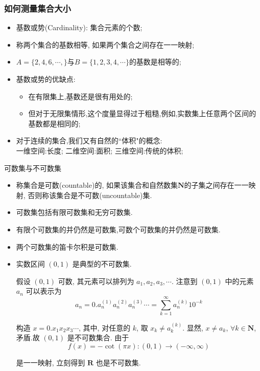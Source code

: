 \documentclass[Prob-All.tex]{subfiles}
\begin{document}
\begin{frame}
	\frametitle{如何测量集合大小}
	\begin{itemize}[<+-|alert@+>]
		\item  基数或势({\rm Cardinality}): 集合元素的个数;
		\item 称两个集合的基数相等, 如果两个集合之间存在一一映射;
		\item $A=\{2,4,6,\cdots,\}$与$B=\{1,2,3,4,\cdots\}$的基数是相等的;
		\item  基数或势的优缺点:
		\begin{itemize}[<+-|alert@+>]
			\item 在有限集上,基数还是很有用处的;
			\item 但对于无限集情形,这个度量显得过于粗糙,例如,实数集上任意两个区间的基数都是相同的;
		\end{itemize}
		\item 对于连续的集合,我们又有自然的``体积"的概念: \\
		一维空间:长度; 二维空间:面积; 三维空间:传统的体积;


	\end{itemize}
\end{frame}
\begin{frame}{可数集与不可数集}
\begin{itemize}[<+-|alert@+>]
	\item 称集合是可数(countable)的, 如果该集合和自然数集${\mathbf{N}}$的子集之间存在一一映射, 否则称该集合是不可数(uncountable)集.
	\item 可数集包括有限可数集和无穷可数集.
	\item 有限个可数集的并仍然是可数集,可数个可数集的并仍然是可数集.
	\item 两个可数集的笛卡尔积是可数集.
	\item 实数区间 ${(0,1)}$ 是典型的不可数集.\pause

	假设 ${(0,1)}$ 可数, 其元素可以排列为 ${a_{1}, a_{2}, a_{3}, \cdots}$. 注意到 ${(0,1)}$ 中的元素 ${a_{n}}$ 可以表示为
	\[
	a_{n}=0. a_{n}^{(1)} a_{n}^{(2)} a_{n}^{(3)} \cdots=\sum_{k=1}^{\infty} a_{n}^{(k)} 10^{-k}
	\]
	\pause

	构造 ${x=0.x_{1} x_{2} x_{3} \cdots}$, 其中, 对任意的 ${k}$, 取 ${x_{k} \neq a_{k}^{(k)}}$. \pause 显然, $x \neq a_{k}$, $\forall k \in \mathbf{N}$,矛盾.故 ${(0,1)}$ 是不可数集合. 由于
	\[
	f(x)=-\cot (\pi x):(0,1) \rightarrow(-\infty, \infty)
	\]

	是一一映射, 立刻得到 ${\mathbf{R}}$ 也是不可数集. %
\end{itemize}

\end{frame}
\end{document}
